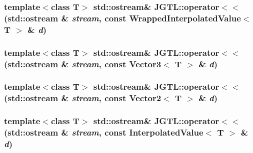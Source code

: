 \hypertarget{namespace_j_g_t_l_5fdc2174e5f64c78281b0cb9223a4d2f}{
\subsubsection[operator$<$$<$]{\setlength{\rightskip}{0pt plus 5cm}template$<$class T$>$ std::ostream\& JGTL::operator$<$$<$ (std::ostream \& {\em stream}, const Wrapped\-Interpolated\-Value$<$ T $>$ \& {\em d})}}
\label{namespace_j_g_t_l_5fdc2174e5f64c78281b0cb9223a4d2f}


\hypertarget{namespace_j_g_t_l_36eb9f0b0f3e2989330d3e2019cbeed4}{
\subsubsection[operator$<$$<$]{\setlength{\rightskip}{0pt plus 5cm}template$<$class T$>$ std::ostream\& JGTL::operator$<$$<$ (std::ostream \& {\em stream}, const Vector3$<$ T $>$ \& {\em d})}}
\label{namespace_j_g_t_l_36eb9f0b0f3e2989330d3e2019cbeed4}


\hypertarget{namespace_j_g_t_l_13f77c42055402468759f015db010146}{
\subsubsection[operator$<$$<$]{\setlength{\rightskip}{0pt plus 5cm}template$<$class T$>$ std::ostream\& JGTL::operator$<$$<$ (std::ostream \& {\em stream}, const Vector2$<$ T $>$ \& {\em d})}}
\label{namespace_j_g_t_l_13f77c42055402468759f015db010146}


\hypertarget{namespace_j_g_t_l_14895317a64983a968bb8236dd6e32d5}{
\subsubsection[operator$<$$<$]{\setlength{\rightskip}{0pt plus 5cm}template$<$class T$>$ std::ostream\& JGTL::operator$<$$<$ (std::ostream \& {\em stream}, const Interpolated\-Value$<$ T $>$ \& {\em d})}}
\label{namespace_j_g_t_l_14895317a64983a968bb8236dd6e32d5}


